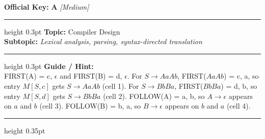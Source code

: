 \documentclass[a4paper,10pt]{article}
\begin{document}
\begin{tcolorbox}
\tcblower

\textbf{Official Key:} \textbf{\large A} \hfill \textit{\small [Medium]}
\vspace{2pt}\hrule height 0.3pt\vspace{3pt}
\textbf{Topic:} Compiler Design \\
\textbf{Subtopic:} \textit{Lexical analysis, parsing, syntax-directed translation}
\vspace{2pt}\hrule height 0.3pt\vspace{3pt}
\textbf{Guide / Hint:} \\
{\small FIRST(A) = {c, $\epsilon$} and FIRST(B) = {d, $\epsilon$}. For $S \to AaAb$, FIRST($AaAb$) = {c, a}, so entry $M[S, c]$ gets $S \to AaAb$ (cell 1). For $S \to BbBa$, FIRST($BbBa$) = {d, b}, so entry $M[S, d]$ gets $S \to BbBa$ (cell 2). FOLLOW(A) = {a, b}, so $A \to \epsilon$ appears on $a$ and $b$ (cell 3). FOLLOW(B) = {b, a}, so $B \to \epsilon$ appears on $b$ and $a$ (cell 4).}

\end{tcolorbox}
\vspace{6pt}\hrule height 0.35pt\vspace{6pt}
\noindent
\end{document}
